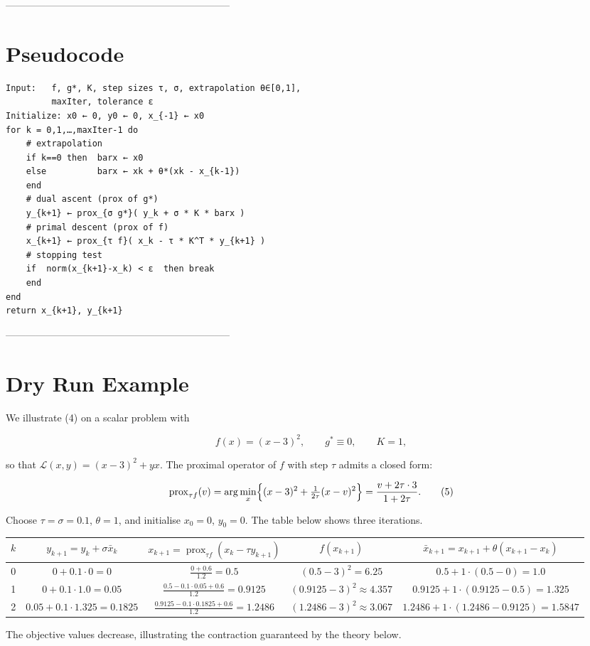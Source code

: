 \documentclass{article}
\begin{document}
--------------------------------------------------------------------
\section*{Pseudocode}
\begin{verbatim}
Input:   f, g*, K, step sizes τ, σ, extrapolation θ∈[0,1],
         maxIter, tolerance ε
Initialize: x0 ← 0, y0 ← 0, x_{-1} ← x0
for k = 0,1,…,maxIter-1 do
    # extrapolation
    if k==0 then  barx ← x0
    else          barx ← xk + θ*(xk - x_{k-1})
    end
    # dual ascent (prox of g*)
    y_{k+1} ← prox_{σ g*}( y_k + σ * K * barx )
    # primal descent (prox of f)
    x_{k+1} ← prox_{τ f}( x_k - τ * K^T * y_{k+1} )
    # stopping test
    if  norm(x_{k+1}-x_k) < ε  then break
    end
end
return x_{k+1}, y_{k+1}
\end{verbatim}
--------------------------------------------------------------------
\section*{Dry Run Example}
We illustrate (4) on a scalar problem with  

\[
f(x)=(x-3)^{2},\qquad g^{*}\equiv0,\qquad K=1,
\]

so that $\mathcal L(x,y)= (x-3)^{2}+yx$.  
The proximal operator of $f$ with step $\tau$ admits a closed form:

\[
\operatorname{prox}_{\tau f}(v)=
\arg\min_{x}\Bigl\{(x-3)^{2}+ \tfrac{1}{2\tau}(x-v)^{2}\Bigr\}
=\frac{v+2\tau\cdot 3}{1+2\tau}.
\tag{5}
\]

Choose $\tau=\sigma=0.1$, $\theta=1$, and initialise $x_{0}=0$, $y_{0}=0$.
The table below shows three iterations.

\begin{center}
\begin{tabular}{c|c|c|c|c}
$k$ & $y_{k+1}=y_{k}+\sigma \bar x_{k}$ &
$x_{k+1}= \operatorname{prox}_{\tau f}(x_{k}-\tau y_{k+1})$ &
$f(x_{k+1})$ & $\bar x_{k+1}=x_{k+1}+ \theta (x_{k+1}-x_{k})$\\ \hline
0 & $0+0.1\cdot0=0$ &
$\frac{0+0.6}{1.2}=0.5$ &
$(0.5-3)^{2}=6.25$ &
$0.5+1\cdot(0.5-0)=1.0$\\ \hline
1 & $0+0.1\cdot1.0=0.05$ &
$\frac{0.5-0.1\cdot0.05+0.6}{1.2}=0.9125$ &
$(0.9125-3)^{2}\approx4.357$ &
$0.9125+1\cdot(0.9125-0.5)=1.325$\\ \hline
2 & $0.05+0.1\cdot1.325=0.1825$ &
$\frac{0.9125-0.1\cdot0.1825+0.6}{1.2}=1.2486$ &
$(1.2486-3)^{2}\approx3.067$ &
$1.2486+1\cdot(1.2486-0.9125)=1.5847$
\end{tabular}
\end{center}
The objective values decrease, illustrating the contraction guaranteed by the theory below.
\end{document}
